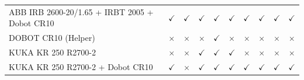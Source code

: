\documentclass{article}
\begin{document}
\begin{table}
\begin{tabular}{@{} p{4.0cm} | c c c c c c c c c @{}}
ABB IRB 2600-20/1.65 \newline + IRBT 2005 \newline + Dobot CR10 & 
$\checkmark$ & 
$\checkmark$ & 
$\checkmark$ & 
$\checkmark$ & 
$\checkmark$ & 
$\checkmark$ & 
$\checkmark$ & 
$\checkmark$ & 
$\checkmark$ \\

DOBOT CR10 (Helper) & 
$\times$ & 
$\times$ & 
$\times$ & 
$\checkmark$ & 
$\times$ & 
$\times$ & 
$\times$ & 
$\times$ & 
$\times$ \\

KUKA KR 250 R2700-2 & 
$\times$ & 
$\times$ & 
$\checkmark$ & 
$\checkmark$ & 
$\checkmark$ & 
$\times$ & 
$\times$ & 
$\times$ & 
$\times$ \\

KUKA KR 250 R2700-2 \newline + Dobot CR10 & 
$\checkmark$ & 
$\times$ & 
$\checkmark$ & 
$\checkmark$ & 
$\checkmark$ & 
$\checkmark$ & 
$\checkmark$ & 
$\checkmark$ & 
$\checkmark$ \\

\bottomrule
\end{tabular}
\end{table}
\end{document}
